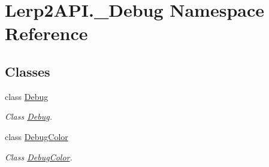 \hypertarget{namespace_lerp2_a_p_i_1_1___debug}{}\section{Lerp2\+A\+P\+I.\+\_\+\+Debug Namespace Reference}
\label{namespace_lerp2_a_p_i_1_1___debug}
\subsection*{Classes}
\begin{DoxyCompactItemize}
\item 
class \hyperlink{class_lerp2_a_p_i_1_1___debug_1_1_debug}{Debug}
\begin{DoxyCompactList}\small\item\em Class \hyperlink{class_lerp2_a_p_i_1_1___debug_1_1_debug}{Debug}. \end{DoxyCompactList}\item 
class \hyperlink{class_lerp2_a_p_i_1_1___debug_1_1_debug_color}{Debug\+Color}
\begin{DoxyCompactList}\small\item\em Class \hyperlink{class_lerp2_a_p_i_1_1___debug_1_1_debug_color}{Debug\+Color}. \end{DoxyCompactList}\end{DoxyCompactItemize}
